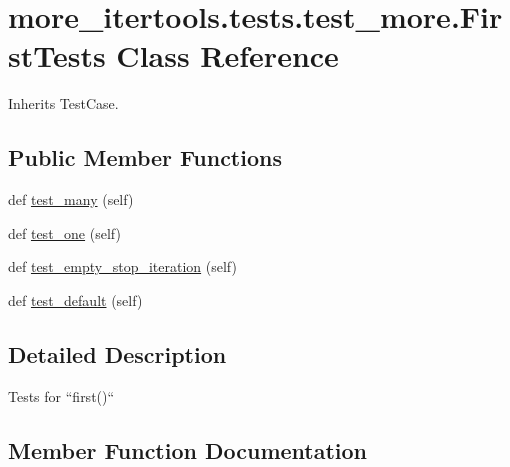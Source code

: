 \hypertarget{classmore__itertools_1_1tests_1_1test__more_1_1_first_tests}{}\section{more\+\_\+itertools.\+tests.\+test\+\_\+more.\+First\+Tests Class Reference}
\label{classmore__itertools_1_1tests_1_1test__more_1_1_first_tests}


Inherits Test\+Case.

\subsection*{Public Member Functions}
\begin{DoxyCompactItemize}
\item 
def \hyperlink{classmore__itertools_1_1tests_1_1test__more_1_1_first_tests_a15e8ef5c2d8093ac2f704e920f720903}{test\+\_\+many} (self)
\item 
def \hyperlink{classmore__itertools_1_1tests_1_1test__more_1_1_first_tests_aa4435615e65ede6a083f73d98ba750f4}{test\+\_\+one} (self)
\item 
def \hyperlink{classmore__itertools_1_1tests_1_1test__more_1_1_first_tests_a9bd6ab4b24e688e46575f4fdac3936cd}{test\+\_\+empty\+\_\+stop\+\_\+iteration} (self)
\item 
def \hyperlink{classmore__itertools_1_1tests_1_1test__more_1_1_first_tests_a50204297ba3ccb12dafe00bec3960d8d}{test\+\_\+default} (self)
\end{DoxyCompactItemize}


\subsection{Detailed Description}
\begin{DoxyVerb}Tests for ``first()``\end{DoxyVerb}
 

\subsection{Member Function Documentation}
\mbox{\label{classmore__itertools_1_1tests_1_1test__more_1_1_first_tests_a50204297ba3ccb12dafe00bec3960d8d}} 
